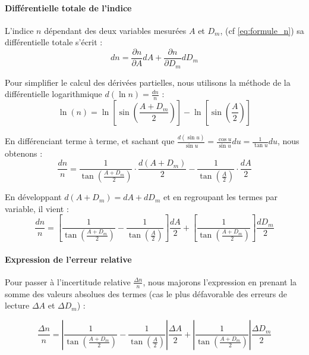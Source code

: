 \paragraph{Différentielle totale de l'indice}
L'indice $n$ dépendant des deux variables mesurées $A$ et $D_m$, (cf \ref{eq:formule_n}) sa différentielle totale s'écrit :
\[ dn = \frac{\partial n}{\partial A} dA + \frac{\partial n}{\partial D_m} dD_m \]

Pour simplifier le calcul des dérivées partielles, nous utilisons la méthode de la différentielle logarithmique $d(\ln n) = \frac{dn}{n}$ :
\[ \ln(n) = \ln\left[\sin\left(\frac{A+D_m}{2}\right)\right] - \ln\left[\sin\left(\frac{A}{2}\right)\right] \]

En différenciant terme à terme, et sachant que $\frac{d(\sin u)}{\sin u} = \frac{\cos u}{\sin u} du = \frac{1}{\tan u} du$, nous obtenons :
\[
    \frac{dn}{n} = \frac{1}{\tan\left(\frac{A+D_m}{2}\right)} \cdot \frac{d(A+D_m)}{2} - \frac{1}{\tan\left(\frac{A}{2}\right)} \cdot \frac{dA}{2}
\]

En développant $d(A+D_m) = dA + dD_m$ et en regroupant les termes par variable, il vient :
\[
    \frac{dn}{n} = \left[ \frac{1}{\tan\left(\frac{A+D_m}{2}\right)} - \frac{1}{\tan\left(\frac{A}{2}\right)} \right] \frac{dA}{2} + \left[ \frac{1}{\tan\left(\frac{A+D_m}{2}\right)} \right] \frac{dD_m}{2}
\]

\paragraph{Expression de l'erreur relative}
Pour passer à l'incertitude relative $\frac{\Delta n}{n}$, nous majorons l'expression en prenant la somme des valeurs absolues des termes (cas le plus défavorable des erreurs de lecture $\Delta A$ et $\Delta D_m$) :

\begin{equation}
    \frac{\Delta n}{n} = \left| \frac{1}{\tan\left(\frac{A + D_m}{2}\right)} - \frac{1}{\tan\left(\frac{A}{2}\right)} \right| \frac{\Delta A}{2} + \left| \frac{1}{\tan\left(\frac{A + D_m}{2}\right)} \right| \frac{\Delta D_m}{2}
\end{equation}